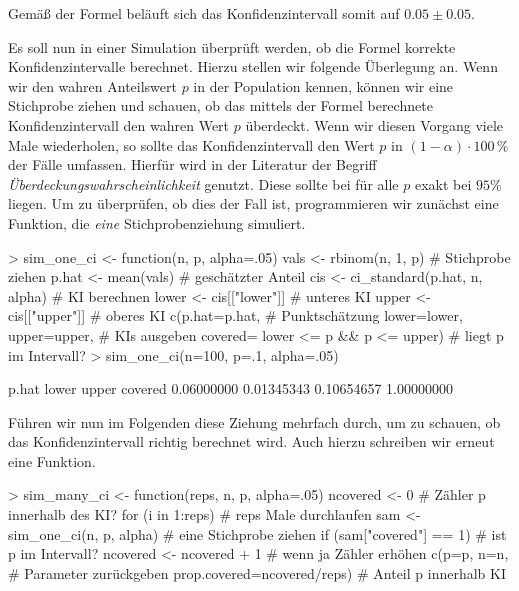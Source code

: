 Gemäß der Formel beläuft sich das Konfidenzintervall somit auf $0.05 \pm 0.05$. 

Es soll nun in einer Simulation überprüft werden, ob die Formel korrekte Konfidenzintervalle berechnet. Hierzu stellen wir folgende Überlegung an. Wenn wir den wahren Anteilswert $p$ in der Population kennen, können wir eine Stichprobe ziehen und schauen, ob das mittels der Formel berechnete Konfidenzintervall den wahren Wert $p$ überdeckt. Wenn wir diesen Vorgang viele Male wiederholen, so sollte das Konfidenzintervall den Wert $p$ in $(1 - \alpha) \cdot 100\,\%$ der Fälle umfassen. Hierfür wird in der Literatur der Begriff \emph{Überdeckungswahrscheinlichkeit} genutzt. Diese sollte bei für alle $p$ exakt bei $95\%$ liegen. Um zu überprüfen, ob dies der Fall ist, programmieren wir zunächst eine Funktion, die \emph{eine} Stichprobenziehung simuliert.


\begin{Schunk}
\begin{Sinput}
> sim_one_ci <- function(n, p, alpha=.05){
   vals <- rbinom(n, 1, p)                # Stichprobe ziehen 
   p.hat <- mean(vals)                    # geschätzter Anteil 
   cis <- ci_standard(p.hat, n, alpha)    # KI berechnen
   lower <- cis[["lower"]]                # unteres KI
   upper <- cis[["upper"]]                # oberes KI
   c(p.hat=p.hat,                         # Punktschätzung
     lower=lower, upper=upper,            # KIs ausgeben
     covered= lower <= p && p <= upper)   # liegt p im Intervall?
 }
> sim_one_ci(n=100, p=.1, alpha=.05)
\end{Sinput}
\begin{Soutput}
     p.hat      lower      upper    covered 
0.06000000 0.01345343 0.10654657 1.00000000 
\end{Soutput}
\end{Schunk}

Führen wir nun im Folgenden diese Ziehung mehrfach durch, um zu schauen, ob das Konfidenzintervall richtig berechnet wird. Auch hierzu schreiben wir erneut eine Funktion.

\begin{Schunk}
\begin{Sinput}
> sim_many_ci <- function(reps, n, p, alpha=.05){
   ncovered <- 0                       # Zähler p innerhalb des KI?
   for (i in 1:reps){                  # reps Male durchlaufen
     sam <- sim_one_ci(n, p, alpha)    # eine Stichprobe ziehen
     if (sam["covered"] == 1)          # ist p im Intervall?       
       ncovered <- ncovered + 1        # wenn ja Zähler erhöhen 
   }
   c(p=p, n=n,                         # Parameter zurückgeben
     prop.covered=ncovered/reps)       # Anteil p innerhalb KI
 }
\end{Sinput}
\end{Schunk}

